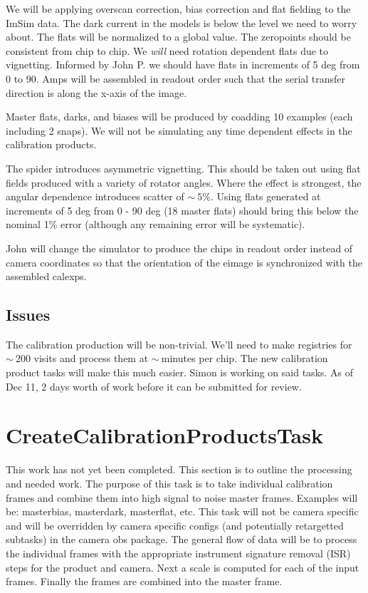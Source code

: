 \documentclass[12pt]{article}
\begin{document}
We will be applying overscan correction, bias correction and flat
fielding to the ImSim data.  The dark current in the models is below
the level we need to worry about.  The flats will be normalized to a
global value.  The zeropoints should be consistent from chip to chip.
We {\it will} need rotation dependent flats due to vignetting.
Informed by John P. we should have flats in increments of 5 deg from 0
to 90.  Amps will be assembled in readout order such that the serial
transfer direction is along the x-axis of the image.

Master flats, darks, and biases will be produced by coadding 10
examples (each including 2 snaps).  We will not be simulating any time
dependent effects in the calibration products.

The spider introduces asymmetric vignetting.  This should be taken out
using flat fields produced with a variety of rotator angles.  Where
the effect is strongest, the angular dependence introduces scatter of
$\sim~5$\%.  Using flats generated at increments of 5 deg from 0 - 90
deg (18 master flats) should bring this below the nominal 1\% error
(although any remaining error will be systematic).

John will change the simulator to produce the chips in readout order
instead of camera coordinates so that the orientation of the eimage is
synchronized with the assembled calexps.

\subsection{Issues}

The calibration production will be non-trivial.  We'll need to make
registries for $\sim~200$ visits and process them at $\sim~$minutes
per chip.  The new calibration product tasks will make this much
easier.  Simon is working on said tasks.  As of Dec 11, 2 days worth
of work before it can be submitted for review.


\clearpage 
\section{CreateCalibrationProductsTask} 
This work has not yet been completed.  This section is to outline the processing and needed work.  
The purpose of this task is to take individual calibration frames and combine them into
high signal to noise master frames.  Examples will be: masterbias, masterdark, masterflat, etc.  
This task will not be camera specific and will be overridden by camera specific configs (and potentially
retargetted subtasks) in the camera obs package.  The general flow of data will be to process the individual frames
with the appropriate instrument signature removal (ISR) steps for the product and camera.  Next a scale is computed for each of the input
frames.  Finally the frames are combined into the master frame.
\end{document}
